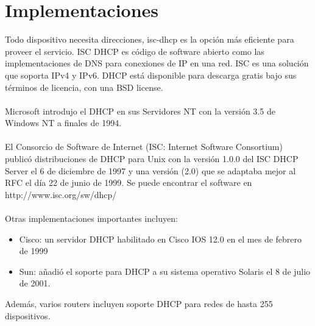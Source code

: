 \section{Implementaciones}
	Todo dispositivo necesita direcciones, isc-dhcp es la opción más eficiente para proveer el servicio. ISC DHCP es código de software abierto como las implementaciones de DNS para conexiones de IP en una red. ISC es una solución que soporta IPv4 y IPv6. DHCP está disponible para descarga gratis bajo sus términos de licencia, con una BSD license.\\\\
	
	Microsoft introdujo el DHCP en sus Servidores NT con la versión 3.5 de Windows NT a finales de 1994.\\\\
	El Consorcio de Software de Internet (ISC: Internet Software Consortium) publicó distribuciones de DHCP para Unix con la versión 1.0.0 del ISC DHCP Server el 6 de diciembre de 1997 y una versión (2.0) que se adaptaba mejor al RFC el día 22 de junio de 1999. Se puede encontrar el software en http://www.isc.org/sw/dhcp/\\\\

Otras implementaciones importantes incluyen:
\begin{itemize}
	\item Cisco: un servidor DHCP habilitado en Cisco IOS 12.0 en el mes de febrero de 1999
	\item Sun: añadió el soporte para DHCP a su sistema operativo Solaris el 8 de julio de 2001.
\end{itemize}

Además, varios routers incluyen soporte DHCP para redes de hasta 255 dispositivos.



	

